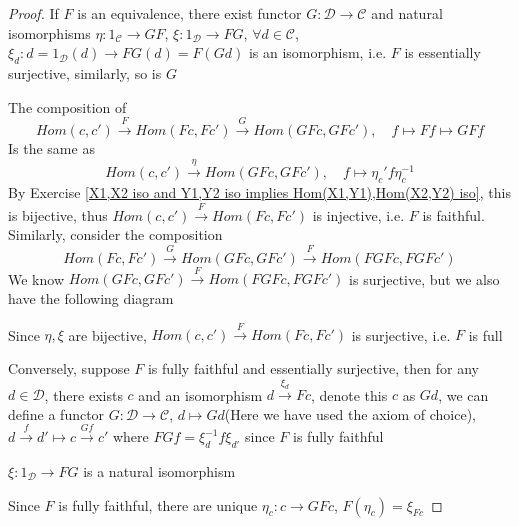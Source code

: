 \documentclass[main]{subfiles}
\begin{document}
\begin{proof}
If $F$ is an equivalence, there exist functor $G:\mathscr D\to \mathscr C$ and natural isomorphisms $\eta:1_{\mathscr C}\to GF$,  $\xi:1_{\mathscr D}\to FG$, $\forall d\in\mathscr C$, $\xi_d:d=1_{\mathscr D}(d)\to FG(d)=F(Gd)$ is an isomorphism, i.e. $F$ is essentially surjective, similarly, so is $G$ \par
The composition of 
\[Hom(c,c')\xrightarrow{F} Hom(Fc,Fc')\xrightarrow{G} Hom(GFc,GFc'),\quad f\mapsto Ff\mapsto GFf\]
Is the same as
\[Hom(c,c')\xrightarrow{\eta} Hom(GFc,GFc'),\quad f\mapsto\eta_{c}'f\eta_c^{-1}\]
By Exercise \ref{X1,X2 iso and Y1,Y2 iso implies Hom(X1,Y1),Hom(X2,Y2) iso}, this is bijective, thus $Hom(c,c')\xrightarrow{F} Hom(Fc,Fc')$ is injective, i.e. $F$ is faithful. Similarly, consider the composition
\[Hom(Fc,Fc')\xrightarrow{G} Hom(GFc,GFc')\xrightarrow{F} Hom(FGFc,FGFc')\]
We know $Hom(GFc,GFc')\xrightarrow{F} Hom(FGFc,FGFc')$ is surjective, but we also have the following diagram
\begin{center}
\end{center}
Since $\eta,\xi$ are bijective, $Hom(c,c')\xrightarrow{F} Hom(Fc,Fc')$ is surjective, i.e. $F$ is full \par
Conversely, suppose $F$ is fully faithful and essentially surjective, then for any $d\in\mathscr D$, there exists $c$ and an isomorphism $d\xrightarrow{\xi_d} Fc$, denote this $c$ as $Gd$, we can define a functor $G:\mathscr D\to\mathscr C$, $d\mapsto Gd$(Here we have used the axiom of choice), $d\xrightarrow{f}d'\mapsto c\xrightarrow{Gf}c'$ where $FGf=\xi_d^{-1}f\xi_{d'}$ since $F$ is fully faithful
\begin{center}
\end{center}
$\xi:1_{\mathscr D}\to FG$ is a natural isomorphism \par
Since $F$ is fully faithful, there are unique $\eta_c:c\to GFc$, $F(\eta_c)=\xi_{Fc}$ \par

\end{proof}
\end{document}
